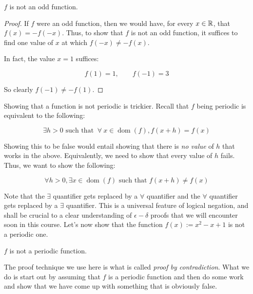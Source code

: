 \documentclass{amsart}
\begin{document}
\begin{claimer}
  $f$ is not an odd function.
\end{claimer}

\begin{proof}
  If $f$ were an odd function, then we would have, for every $x \in
  \mathbb{R}$, that $f(x) = -f(-x)$. Thus, to show that $f$ is not an odd
  function, it suffices to find one value of $x$ at which $f(-x) \ne
  -f(x)$.

  In fact, the value $x = 1$ suffices:

  $$f(1) = 1, \qquad f(-1) = 3$$

  So clearly $f(-1) \ne -f(1)$.
\end{proof}

Showing that a function is not periodic is trickier. Recall that $f$
being periodic is equivalent to the following:

\begin{equation*}
  \exists h > 0 \text{ such that } \ \forall \ x \in
  \operatorname{dom}(f), f(x + h) = f(x)
\end{equation*}

Showing this to be false would entail showing that there is {\em no
value} of $h$ that works in the above. Equivalently, we need to show
that every value of $h$ fails. Thus, we want to show the following:

\begin{equation*}
  \forall h > 0, \exists x \in \operatorname{dom}(f) \text{ such that } f(x + h) \ne f(x)
\end{equation*}

Note that the $\exists$ quantifier gets replaced by a $\forall$
quantifier and the $\forall$ quantifier gets replaced by a $\exists$
quantifier. This is a universal feature of logical negation, and shall
be crucial to a clear understanding of $\epsilon-\delta$ proofs that
we will encounter soon in this course. Let's now show that the
function $f(x) := x^2 - x + 1$ is not a periodic one.

\begin{claimer}
  $f$ is not a periodic function.
\end{claimer}

The proof technique we use here is what is called {\em proof by
contradiction}. What we do is start out by assuming that $f$ is a
periodic function and then do some work and show that we have come up
with something that is obviously false.
\end{document}
